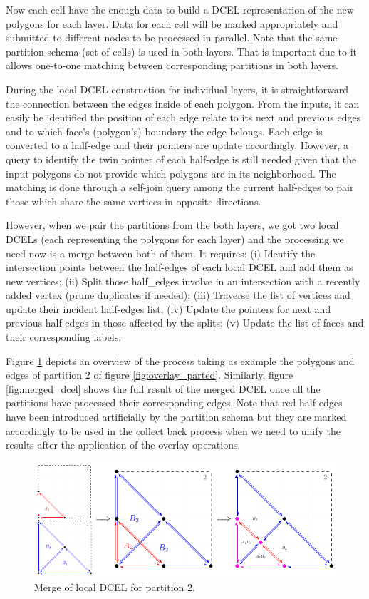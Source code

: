 Now each cell have the enough data to build a DCEL representation of the new polygons for each layer.  Data for each cell will be marked appropriately and submitted to different nodes to be processed in parallel.  Note that the same partition schema (set of cells) is used in both layers.  That is important due to it allows one-to-one matching between corresponding partitions in both layers.

During the local DCEL construction for individual layers, it is straightforward the connection between the edges inside of each polygon.  From the inputs, it can easily be identified the position of each edge relate to its next and previous edges and to which face's (polygon's) boundary the edge belongs.  Each edge is converted to a half-edge and their pointers are update accordingly.  However, a query to identify the twin pointer of each half-edge is still needed given that the input polygons do not provide which polygons are in its neighborhood. The matching is done through a self-join query among the current half-edges to pair those which share the same vertices in opposite directions.

However, when we pair the partitions from the both layers, we got two local DCELs (each representing the polygons for each layer) and the processing we need now is a merge between both of them.  It requires: (i) Identify the intersection points between the half-edges of each local DCEL and add them as new vertices; (ii) Split those half\_edges involve in an intersection with a recently added vertex (prune duplicates if needed); (iii) Traverse the list of vertices and update their incident half-edges list; (iv) Update the pointers for next and previous half-edges in those affected by the splits; (v) Update the list of faces and their corresponding labels.

Figure \ref{fig:part2} depicts an overview of the process taking as example the polygons and edges of partition 2 of figure \ref{fig:overlay_parted}.  Similarly, figure \ref{fig:merged_dcel} shows the full result of the merged DCEL once all the partitions have processed their corresponding edges. Note that red half-edges have been introduced artificially by the partition schema but they are marked accordingly to be used in the collect back process when we need to unify the results after the application of the overlay operations.

\begin{figure}[!ht]
    \centering
    \includegraphics[width=0.9\linewidth]{figures/02-Part2}
    \caption{Merge of local DCEL for partition 2.}\label{fig:part2}
\end{figure}


